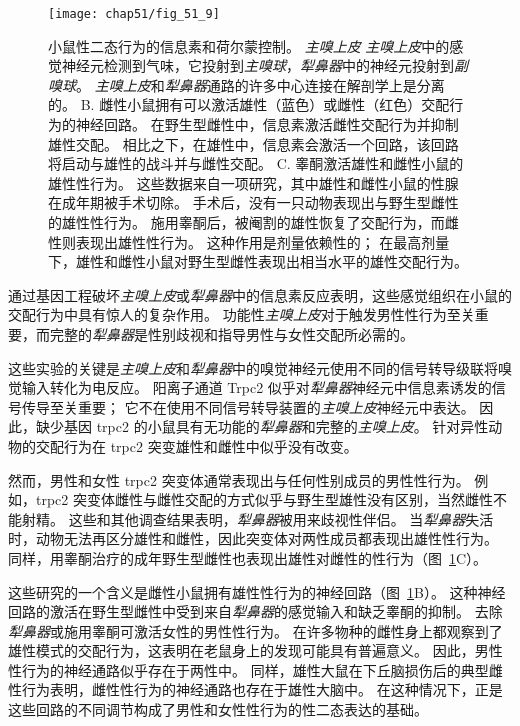 \begin{figure}[htbp]
	\centering
	\texttt{[image: chap51/fig\_51\_9]}
	\caption{小鼠性二态行为的信息素和荷尔蒙控制。
		\textit{主嗅上皮} \textit{主嗅上皮}中的感觉神经元检测到气味，它投射到\textit{主嗅球}，\textit{犁鼻器}中的神经元投射到\textit{副嗅球}。
		\textit{主嗅上皮}和\textit{犁鼻器}通路的许多中心连接在解剖学上是分离的\cite{dulac2006genetic}。
		B. 雌性小鼠拥有可以激活雄性（蓝色）或雌性（红色）交配行为的神经回路。
		在野生型雌性中，信息素激活雌性交配行为并抑制雄性交配。
		相比之下，在雄性中，信息素会激活一个回路，该回路将启动与雄性的战斗并与雌性交配\cite{kimchi2007functional}。
		C. 睾酮激活雄性和雌性小鼠的雄性性行为。
		这些数据来自一项研究，其中雄性和雌性小鼠的性腺在成年期被手术切除。
		手术后，没有一只动物表现出与野生型雌性的雄性性行为。
		施用睾酮后，被阉割的雄性恢复了交配行为，而雌性则表现出雄性性行为。
		这种作用是剂量依赖性的；
		在最高剂量下，雄性和雌性小鼠对野生型雌性表现出相当水平的雄性交配行为\cite{edwards1971early}。 }
	\label{fig:51_9}
\end{figure}


通过基因工程破坏\textit{主嗅上皮}或\textit{犁鼻器}中的信息素反应表明，这些感觉组织在小鼠的交配行为中具有惊人的复杂作用。
功能性\textit{主嗅上皮}对于触发男性性行为至关重要，而完整的\textit{犁鼻器}是性别歧视和指导男性与女性交配所必需的。


这些实验的关键是\textit{主嗅上皮}和\textit{犁鼻器}中的嗅觉神经元使用不同的信号转导级联将嗅觉输入转化为电反应。
阳离子通道 Trpc2 似乎对\textit{犁鼻器}神经元中信息素诱发的信号传导至关重要；
它不在使用不同信号转导装置的\textit{主嗅上皮}神经元中表达。
因此，缺少基因 trpc2 的小鼠具有无功能的\textit{犁鼻器}和完整的\textit{主嗅上皮}。
针对异性动物的交配行为在 trpc2 突变雄性和雌性中似乎没有改变。


然而，男性和女性 trpc2 突变体通常表现出与任何性别成员的男性性行为。
例如，trpc2 突变体雌性与雌性交配的方式似乎与野生型雄性没有区别，当然雌性不能射精。
这些和其他调查结果表明，\textit{犁鼻器}被用来歧视性伴侣。
当\textit{犁鼻器}失活时，动物无法再区分雄性和雌性，因此突变体对两性成员都表现出雄性性行为。
同样，用睾酮治疗的成年野生型雌性也表现出雄性对雌性的性行为（图~\ref{fig:51_9}C）。


这些研究的一个含义是雌性小鼠拥有雄性性行为的神经回路（图~\ref{fig:51_9}B）。
这种神经回路的激活在野生型雌性中受到来自\textit{犁鼻器}的感觉输入和缺乏睾酮的抑制。
去除\textit{犁鼻器}或施用睾酮可激活女性的男性性行为。
在许多物种的雌性身上都观察到了雄性模式的交配行为，这表明在老鼠身上的发现可能具有普遍意义。
因此，男性性行为的神经通路似乎存在于两性中。
同样，雄性大鼠在下丘脑损伤后的典型雌性行为表明，雌性性行为的神经通路也存在于雄性大脑中。
在这种情况下，正是这些回路的不同调节构成了男性和女性性行为的性二态表达的基础。



